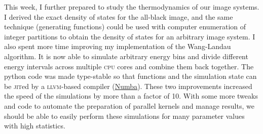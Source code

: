 \documentclass[../notebook.tex]{subfiles}
\begin{document}
\label{sec:sum3}

This week, I further prepared to study the thermodynamics of our image systems.
I derived the exact density of states for the all-black image, and the same
technique (generating functions) could be used with computer enumeration of
integer partitions to obtain the density of states for an arbitrary image
system. I also spent more time improving my implementation of the Wang-Landau
algorithm. It is now able to simulate arbitrary energy bins and divide different
energy intervals across multiple \textsc{cpu} cores and combine them back
together. The python code was made type-stable so that functions and the
simulation state can be \textsc{jit}ed by a \textsc{llvm}-based compiler
(\href{https://numba.pydata.org/}{Numba}). These two improvements increased the
speed of the simulations by more than a factor of 10. With some more tweaks and
code to automate the preparation of parallel kernels and manage results, we
should be able to easily perform these simulations for many parameter values
with high statistics.
\end{document}

